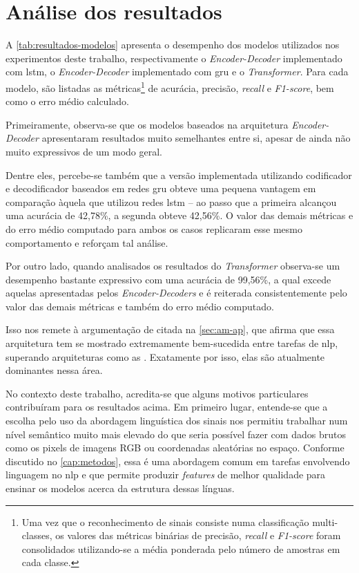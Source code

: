 \section{Análise dos resultados}
\label{sec:avaliacao-resultados}

A \autoref{tab:resultados-modelos} apresenta o desempenho dos modelos utilizados nos experimentos deste trabalho, respectivamente o \textit{Encoder-Decoder} implementado com \acrshort{lstm}, o \textit{Encoder-Decoder} implementado com \acrshort{gru} e o \textit{Transformer}.
Para cada modelo, são listadas as métricas\footnote{
    Uma vez que o reconhecimento de sinais consiste numa classificação multi-classes, os valores das métricas binárias de precisão, \textit{recall} e \textit{F1-score} foram consolidados utilizando-se a média ponderada pelo número de amostras em cada classe.
} de acurácia, precisão, \textit{recall} e \textit{F1-score}, bem como o erro médio calculado.



Primeiramente, observa-se que os modelos baseados na arquitetura \textit{Encoder-Decoder} apresentaram resultados muito semelhantes entre si, apesar de ainda não muito expressivos de um modo geral.

Dentre eles, percebe-se também que a versão implementada utilizando codificador e decodificador baseados em redes \acrshort{gru} obteve uma pequena vantagem em comparação àquela que utilizou redes \acrshort{lstm} -- ao passo que a primeira alcançou uma acurácia de 42,78\%, a segunda obteve 42,56\%.
O valor das demais métricas e do erro médio computado para ambos os casos replicaram esse mesmo comportamento e reforçam tal análise.

Por outro lado, quando analisados os resultados do \textit{Transformer} observa-se um desempenho bastante expressivo com uma acurácia de 99,56\%, a qual excede aquelas apresentadas pelos \textit{Encoder-Decoders} e é reiterada consistentemente pelo valor das demais métricas e também do erro médio computado.

Isso nos remete à argumentação de  citada na \autoref{sec:am-ap}, que afirma que essa arquitetura tem se mostrado extremamente bem-sucedida entre tarefas de \acrfull{nlp}, superando arquiteturas como as . Exatamente por isso, elas são atualmente dominantes nessa área.

No contexto deste trabalho, acredita-se que alguns motivos particulares contribuíram para os resultados acima.
Em primeiro lugar, entende-se que a escolha pelo uso da abordagem linguística dos sinais nos permitiu trabalhar num nível semântico muito mais elevado do que seria possível fazer com dados brutos como os pixels de imagens RGB ou coordenadas aleatórias no espaço. Conforme discutido no \autoref{cap:metodos}, essa é uma abordagem comum em tarefas envolvendo linguagem no \acrshort{nlp} e que permite produzir \textit{features} de melhor qualidade para ensinar os modelos acerca da estrutura dessas línguas.

